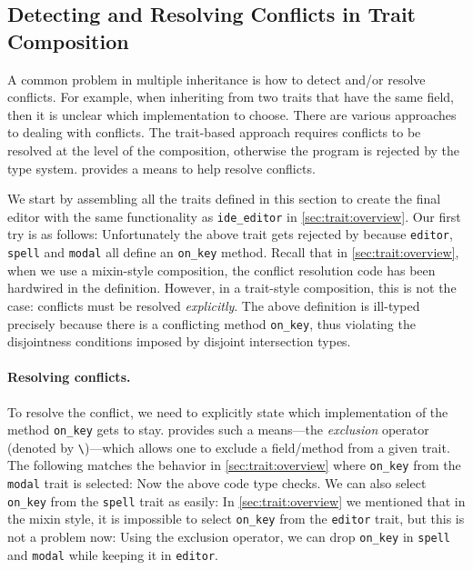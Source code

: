 \subsection{Detecting and Resolving Conflicts in Trait Composition}
\label{sec:trait:forward}

A common problem in multiple inheritance is how to detect and/or resolve conflicts. For example, when
inheriting from two traits that have the same field, then it is unclear which
implementation to choose. There are various approaches to dealing with
conflicts. The trait-based approach requires conflicts to be resolved at the
level of the composition, otherwise the program is rejected by
the type system. \sedel provides a means to help resolve conflicts.

We start by assembling all the traits defined in this section
to create the final editor with the same functionality as
\lstinline{ide_editor} in \cref{sec:trait:overview}. Our first try is as follows:
Unfortunately the above trait gets rejected by \sedel because
\lstinline{editor}, \lstinline{spell} and \lstinline{modal} all define an \lstinline{on_key} method.
Recall that in \cref{sec:trait:overview}, when we use a mixin-style composition,
the conflict resolution code has been hardwired in the definition.
However, in a trait-style composition, this is not the case: conflicts must be resolved \emph{explicitly}.
The
above definition is ill-typed precisely because there is a conflicting
method \lstinline{on_key}, thus violating the disjointness conditions
imposed by disjoint intersection types.

\paragraph{Resolving conflicts.}

To resolve the conflict, we need to explicitly state which implementation of the method
\lstinline{on_key} gets to stay. \sedel provides such a means---the \emph{exclusion} operator (denoted by \lstinline$\$)---which allows one to
exclude a field/method from a given trait. The following matches the behavior
in \cref{sec:trait:overview} where \lstinline{on_key} from the \lstinline{modal} trait
is selected:
Now the above code type checks. We can also select \lstinline{on_key} from the \lstinline{spell} trait as easily:
In \cref{sec:trait:overview} we mentioned that in the mixin style, it is impossible
to select \lstinline{on_key} from the \lstinline{editor} trait, but this is not a problem now:
Using the exclusion operator, we can drop \lstinline{on_key} in \lstinline{spell} and \lstinline{modal} while
keeping it in \lstinline{editor}.


